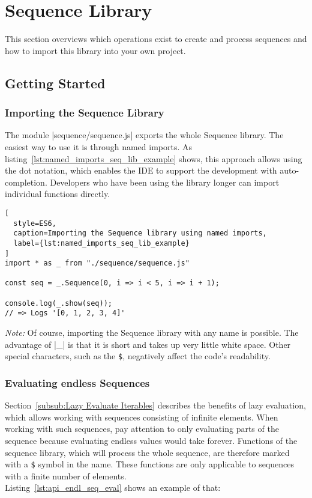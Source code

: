 \section{Sequence Library} %
\label{sec:Sequence Library}
This section overviews which operations exist to create and process sequences
and how to import this library into your own project.
\subsection{Getting Started} %
\label{sub:Getting Started}
\subsubsection{Importing the Sequence Library} %
\label{subsub:Importing the Sequence Library}

The module |sequence/sequence.js| exports the whole Sequence library. The
easiest way to use it is through named imports. As
listing~\ref{lst:named_imports_seq_lib_example} shows, this approach allows
using the dot notation, which enables the IDE to support the development with
auto-completion. Developers who have been using the library longer can import
individual functions directly.
\begin{lstlisting}[
  style=ES6,
  caption=Importing the Sequence library using named imports,
  label={lst:named_imports_seq_lib_example}
]
import * as _ from "./sequence/sequence.js"

const seq = _.Sequence(0, i => i < 5, i => i + 1);

console.log(_.show(seq));
// => Logs '[0, 1, 2, 3, 4]'
\end{lstlisting}
\textit{Note:} Of course, importing the Sequence library with any name is
possible. The advantage of |_| is that it is short and takes up very little
white space. Other special characters, such as the \lstinline{$}, negatively
affect the code's readability. 

\subsubsection{Evaluating endless Sequences} %
\label{subsub:Evaluating endless Sequences}
Section~\ref{subsub:Lazy Evaluate Iterables} describes the benefits of lazy
evaluation, which allows working with sequences consisting of infinite
elements. When working with such sequences, pay attention to only evaluating
parts of the sequence because evaluating endless values would take forever.
Functions of the sequence library, which will process the whole sequence, are
therefore marked with a \lstinline{$} symbol in the name. These functions are
only applicable to sequences with a finite number of elements. \\
Listing~\ref{lst:api_endl_seq_eval} shows an example of that:

